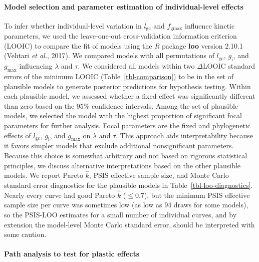 \documentclass[
  letterpaper,
  DIV=11,
  numbers=noendperiod]{scrartcl}
\let\oldparagraph\paragraph
\renewcommand{\paragraph}[1]{\oldparagraph{#1}\mbox{}}
\newcommand{\fgmax}{$f_\mathrm{gmax}$}
\newcommand{\gcl}{$l_\mathrm{gc}$}
\newcommand{\gi}{$g_\mathrm{i}$}
\newcommand{\gmax}{$g_\mathrm{max}$}
\begin{document}
\paragraph{Model selection and parameter estimation of individual-level
effects}\label{model-selection-and-parameter-estimation-of-individual-level-effects}

To infer whether individual-level variation in \gcl{} and \fgmax{}
influence kinetic parameters, we used the leave-one-out cross-validation
information criterion (LOOIC) to compare the fit of models using the
\emph{R} package \textbf{loo} version 2.10.1 (Vehtari \emph{et al.},
2017). We compared models with all permutations of \gcl, \gi, and
\gmax{} influencing \(\lambda\) and \(\tau\). We considered all models
within two \(\Delta\)LOOIC standard errors of the minimum LOOIC
(Table~\ref{tbl-comparison}) to be in the set of plausible models to
generate posterior predictions for hypothesis testing. Within each
plausible model, we assessed whether a fixed effect was significantly
different than zero based on the 95\% confidence intervals. Among the
set of plausible models, we selected the model with the highest
proportion of significant focal parameters for further analysis. Focal
parameters are the fixed and phylogenetic effects of \gcl, \gi, and
\gmax{} on \(\lambda\) and \(\tau\). This approach aids interpretability
because it favors simpler models that exclude additional nonsignificant
parameters. Because this choice is somewhat arbitrary and not based on
rigorous statistical principles, we discuss alternative interpretations
based on the other plausible models. We report Pareto \(\hat{k}\), PSIS
effective sample size, and Monte Carlo standard error diagnostics for
the plausible models in Table~\ref{tbl-loo-diagnostics}. Nearly every
curve had good Pareto \(\hat{k}\) (\(\le 0.7\)), but the minimum PSIS
effective sample size per curve was sometimes low (as low as 94 draws
for some models), so the PSIS-LOO estimates for a small number of
individual curves, and by extension the model-level Monte Carlo standard
error, should be interpreted with some caution.

\paragraph{Path analysis to test for plastic
effects}\label{path-analysis-to-test-for-plastic-effects}
\end{document}

